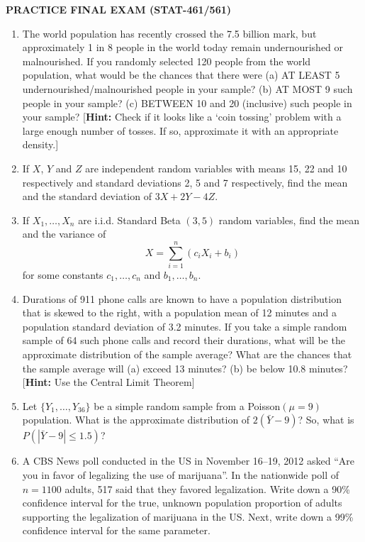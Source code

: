 \documentclass[11pt]{article}
\begin{document}
\begin{center}
    {\Large \textbf{PRACTICE FINAL EXAM (STAT-461/561)}}
\end{center}

\begin{enumerate}[label=(\arabic*), leftmargin=*, itemsep=1.15em]

\item The world population has recently crossed the 7.5 billion mark, but approximately 1 in 8 people in the world today remain undernourished or malnourished. If you randomly selected 120 people from the world population, what would be the chances that there were (a) AT LEAST 5 undernourished/malnourished people in your sample? (b) AT MOST 9 such people in your sample? (c) BETWEEN 10 and 20 (inclusive) such people in your sample? [\textbf{Hint:} Check if it looks like a `coin tossing' problem with a large enough number of tosses. If so, approximate it with an appropriate density.]

\item If $X$, $Y$ and $Z$ are independent random variables with means 15, 22 and 10 respectively and standard deviations 2, 5 and 7 respectively, find the mean and the standard deviation of $3X + 2Y - 4Z$.

\item If $X_1,\ldots,X_n$ are i.i.d. Standard Beta $(3,5)$ random variables, find the mean and the variance of
\[
    X = \sum_{i=1}^{n}(c_iX_i+b_i)
\]
for some constants $c_1,\ldots,c_n$ and $b_1,\ldots,b_n$.

\item Durations of 911 phone calls are known to have a population distribution that is skewed to the right, with a population mean of 12 minutes and a population standard deviation of 3.2 minutes. If you take a simple random sample of 64 such phone calls and record their durations, what will be the approximate distribution of the sample average? What are the chances that the sample average will (a) exceed 13 minutes? (b) be below 10.8 minutes? [\textbf{Hint:} Use the Central Limit Theorem]

\item Let $\{Y_1,\ldots,Y_{36}\}$ be a simple random sample from a Poisson$(\mu=9)$ population. What is the approximate distribution of $2(\bar{Y}-9)$? So, what is $P(|\bar{Y}-9|\leq 1.5)$?

\item A CBS News poll conducted in the US in November 16--19, 2012 asked ``Are you in favor of legalizing the use of marijuana''. In the nationwide poll of $n=1100$ adults, 517 said that they favored legalization. Write down a 90\% confidence interval for the true, unknown population proportion of adults supporting the legalization of marijuana in the US. Next, write down a 99\% confidence interval for the same parameter.


\end{enumerate}
\end{document}

